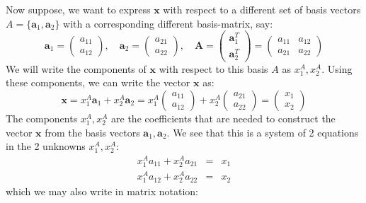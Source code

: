 Now suppose, we want to express $\mathbf{x}$ with respect to a different set of basis vectors $A = \{\mathbf{a}_1, \mathbf{a}_2\}$ with a corresponding different basis-matrix, say:
\begin{equation}
 \mathbf{a}_1 
 =
 \begin{pmatrix} 
  a_{11} \\
  a_{12}
 \end{pmatrix}, \quad
 \mathbf{a}_2 
 =
 \begin{pmatrix} 
  a_{21} \\
  a_{22}
 \end{pmatrix}, \quad
 \mathbf{A}
 =
 \begin{pmatrix} 
  \mathbf{a}_1^T  \\
  \mathbf{a}_2^T 
 \end{pmatrix} 
 =
 \begin{pmatrix} 
  a_{11} & a_{12} \\
  a_{21} & a_{22}
 \end{pmatrix} 
\end{equation}
We will write the components of $\mathbf{x}$ with respect to this basis $A$ as $x_1^A, x_2^A$. Using these components, we can write the vector $\mathbf{x}$ as:
\begin{equation}
 \mathbf{x} 
 =
 x_1^A \mathbf{a}_1 + x_2^A \mathbf{a}_2
 = 
 x_1^A
 \begin{pmatrix} 
  a_{11} \\
  a_{12} 
 \end{pmatrix}
 +
 x_2^A
 \begin{pmatrix} 
  a_{21} \\
  a_{22} 
 \end{pmatrix} 
 =   
 \begin{pmatrix} 
  x_1 \\
  x_2
 \end{pmatrix}  
\end{equation}
The components $x_1^A, x_2^A$ are the coefficients that are needed to construct the vector $\mathbf{x}$ from the basis vectors $\mathbf{a}_1, \mathbf{a}_2$. We see that this is a system of 2 equations in the 2 unknowns $x_1^A, x_2^A$:
\begin{eqnarray}
  x_1^A a_{11} + x_2^A a_{21} &=& x_1 \\
  x_1^A a_{12} + x_2^A a_{22} &=& x_2 
\end{eqnarray}
which we may also write in matrix notation:
